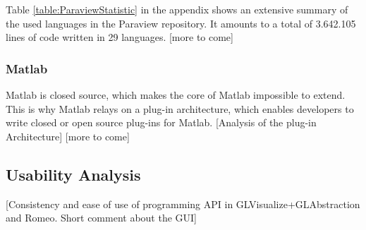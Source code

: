Table \ref{table:ParaviewStatistic} in the appendix shows an extensive summary of the used languages in the Paraview repository.
It amounts to a total of 3.642.105 lines of code written in 29 languages.
[more to come]

\subsubsection{Matlab}

Matlab is closed source, which makes the core of Matlab impossible to extend.
This is why Matlab relays on a plug-in architecture, which enables developers to write closed or open source plug-ins for Matlab.
[Analysis of the plug-in Architecture]
[more to come]
\subsection{Usability Analysis}
[Consistency and ease of use of programming API in GLVisualize+GLAbstraction and Romeo.
Short comment about the \ac{GUI}]
